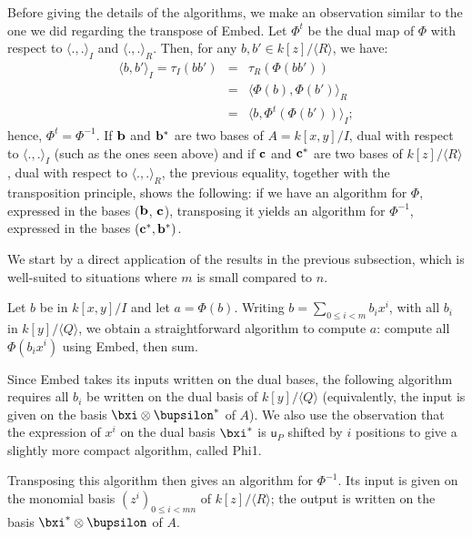 \documentclass{sig-alternate}
\def\vu {\ensuremath{\mathsf{u}}}
\newcounter{algo}
\newcommand{\ang}[1]{\langle#1\rangle}
\begin{document}
Before giving the details of the algorithms, we make an observation
similar to the one we did regarding the transpose of {\sf Embed}. Let
$\Phi^t$ be the dual map of $\Phi$ with respect to $\ang{.,.}_I$ and
$\ang{.,.}_R$. Then, for any $b,b' \in k[z]/\ang{R}$, we have:
\begin{eqnarray*}
\ang{b,b'}_I=\tau_I(b b') &=&  \tau_R(\Phi(b b'))\\
&=& \ang{\Phi(b), \Phi(b')}_R \\
&=& \ang{b, \Phi^t(\Phi(b'))}_I;
\end{eqnarray*}
hence, $\Phi^t = \Phi^{-1}$. If ${\bf b}$ and ${\bf b}^\ast$ are two
bases of $A=k[x,y]/I$, dual with respect to $\ang{.,.}_I$ (such as the
ones seen above) and if ${\bf c}$ and ${\bf c}^\ast$ are two bases of
$k[z]/\ang{R}$, dual with respect to $\ang{.,.}_R$, the previous
equality, together with the transposition principle, shows the
following: if we have an algorithm for $\Phi$, expressed in the bases
(${\bf b}$, ${\bf c}$), transposing it yields an algorithm for
$\Phi^{-1}$, expressed in the bases $({\bf c}^\ast,{\bf b}^\ast)$.

\smallskip{}
We start by a direct application of the results in the previous
subsection, which is well-suited to situations where $m$ is small
compared to $n$.

Let $b$ be in $k[x,y]/I$ and let $a=\Phi(b)$. Writing $b=\sum_{0 \le i
  < m} b_i x^i$, with all $b_i$ in $k[y]/\ang{Q}$, we obtain a
straightforward algorithm to compute $a$: compute all $\Phi(b_i x^i)$
using {\sf Embed}, then sum.

Since {\sf Embed} takes its inputs written on the dual bases, the
following algorithm requires all $b_i$ be written on the dual basis of
$k[y]/\ang{Q}$ (equivalently, the input is given on the basis $\bxi
\otimes \bupsilon^\ast$ of $A$). We also use the observation that
the expression of $x^i$ on the dual basis $\bxi^\ast$ is $\vu_P$
shifted by $i$ positions to give a slightly more compact algorithm, 
called {\sf Phi1}.

Transposing this algorithm then gives an algorithm for
$\Phi^{-1}$. Its input is given on the monomial basis $(z^i)_{0 \le i
  < mn}$ of $k[z]/\ang{R}$; the output is written on the basis
$\bxi^\ast \otimes \bupsilon$ of $A$.
\end{document}
